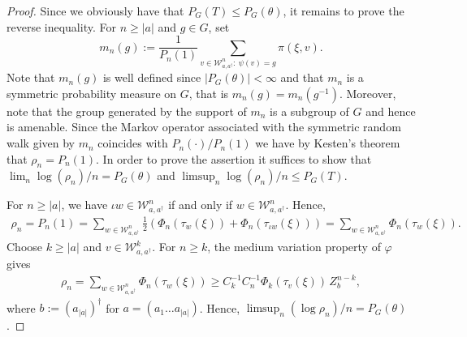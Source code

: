 \documentclass[10pt]{article}
\theoremstyle{mystyle}
\newcommand{\cW}{\mathcal{W}}
\newcommand{\te}{{\theta}}
\newcommand{\1}{\mathbf{1}}
\begin{document}
\begin{proof} Since we obviously have that $P_G(T) \leq P_G(\te)$, it remains to prove the reverse inequality. For $n \geq |a|$ and $g \in G$, set 
\[m_n(g):= \frac{1}{P_n(1)}\sum_{v \in \cW^n_{a,a^\dagger}: \ \psi(v)=g} \pi{(\xi,v)}. 
\]
Note that $m_n(g)$ is well defined since $|P_G(\te)|<\infty$ and that $m_n$ is a symmetric probability measure on $G$, that is $m_n(g)=m_n(g^{-1})$. Moreover, note that the group generated by the support of $m_n$ is a subgroup of $G$ and hence is amenable.  
Since the Markov operator associated with the symmetric random walk given by $m_n$ coincides with $P_n(\cdot)/P_n(1)$ we have by Kesten's theorem that $\rho_n = P_n(1)$. In order to prove the assertion it suffices to show that  $\lim_n \log (\rho_n)/n = P_G(\te)$ and $\limsup_n \log (\rho_n)/n \leq P_G(T)$.

 For $n \geq |a|$, we have $\iota w \in \cW^n_{a,a^\dagger}$ if and only if $w \in \cW^n_{a,a^\dagger}$. Hence, 
\begin{align*}
 \rho_n = P_n(1) =  \sum_{w \in \cW^n_{a,a^\dagger}} \frac{1}{2} \left(\Phi_n(\tau_w(\xi)) + \Phi_n(\tau_{\iota w}(\xi))\right) =  
 \sum_{w \in \cW^n_{a,a^\dagger}}  \Phi_n(\tau_w(\xi)).
 \end{align*}
 Choose $k \geq |a|$ and $v \in \cW^k_{a,a^\dagger}$. For $n \geq k$, the medium variation property of $\varphi$ gives  
\begin{align*}
 \rho_n =  \sum_{w \in \cW^n_{a,a^\dagger}}  \Phi_n(\tau_w(\xi))
\geq   C_k^{-1} C^{-1}_{n} \Phi_k(\tau_v(\xi))\, Z^{n-k}_b,
\end{align*}
where $b := (a_{|a|})^\dagger$ for $a =(a_1\ldots a_{|a|})$. Hence, $\limsup_n (\log \rho_n)/n = P_G(\te)$.
 

\end{proof}
\end{document}
